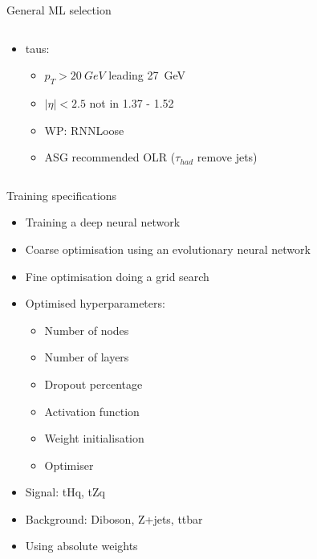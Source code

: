 \begin{frame}{General ML selection}
\begin{columns}
\begin{column}{0.7\textwidth}
\begin{itemize}
\begin{itemize}
\end{itemize}
\item taus:
\vspace*{-0.02\textwidth}
\begin{itemize}
\footnotesize
\item $p_T>\SI{20}{GeV}$ leading \SI{27}{GeV}
\item $|\eta|<2.5$ not in 1.37 - 1.52
\item WP: RNNLoose
\item ASG recommended OLR ($\tau_{had}$ remove jets)
\end{itemize}
\end{itemize}
\end{column}
\end{columns}

\end{frame}
  
  \begin{frame}{Training specifications}
    \begin{itemize}
        \item Training a deep neural network
        \vspace{0.2cm}
        \item Coarse optimisation using an evolutionary neural network
        \vspace{0.2cm}
        \item Fine optimisation doing a grid search
        \vspace{0.2cm}
        \item Optimised hyperparameters:
            \begin{itemize}
                \item Number of nodes
                \item Number of layers
                \item Dropout percentage
                \item Activation function
                \item Weight initialisation
                \item Optimiser
            \end{itemize}
        \item Signal: tHq, tZq
        \item Background: Diboson, Z+jets, ttbar
        \item Using absolute weights
    \end{itemize}
  \end{frame}